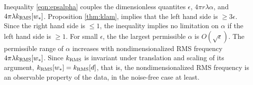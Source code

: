 Inequality \ref{eqn:epsalpha} couples the dimensionless quantites
$\epsilon$,  $4\pi r \lambda \alpha$, and $4 \pi \lambda
k_{\rm RMS}[w_*]$. Proposition \ref{thm:klam}, implies that the left
hand side is $\ge 3\epsilon$. Since the right hand side is $\le 1$,
the inequality implies no limitation on $\alpha$ if the left hand side
is $\ge 1$. For small $\epsilon$, the the largest permissible $\alpha$
is $O(\sqrt{\epsilon})$. The permissible range of $\alpha$ increases with
nondimensionalized RMS frequency $4\pi \lambda k_{\rm RMS}[w_*]$. Since
$k_{\rm RMS}$ is invariant under translation and scaling of its argument,
$k_{\rm RMS}[w_*]=k_{\rm RMS}[d]$, that is, the nondimensionalized RMS frequency
is an observable property of the data, in the noise-free case at
least.

